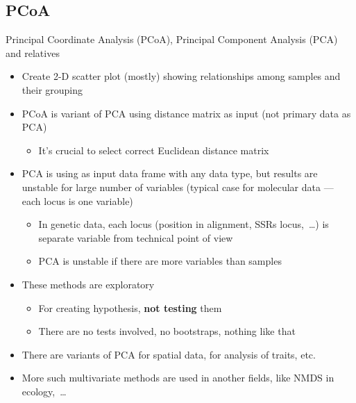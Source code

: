 \documentclass[compress, xelatex, 11pt, xcolor=svgnames, aspectratio=169, url={hyphens, lowtilde}]{beamer}
\begin{document}
\subsection{PCoA}

\begin{frame}{Principal Coordinate Analysis (PCoA), Principal Component Analysis (PCA) and relatives}
	\label{pcoa}
	\begin{itemize}
		\item Create 2-D scatter plot (mostly) showing relationships among samples and their grouping
		\item PCoA is variant of PCA using distance matrix as input (not primary data as PCA)
		\begin{itemize}
			\item It's crucial to select correct Euclidean distance matrix
		\end{itemize}
		\item PCA is using as input data frame with any data type, but results are unstable for large number of variables (typical case for molecular data --- each locus is one variable)
		\begin{itemize}
			\item In genetic data, each locus (position in alignment, SSRs locus,~\ldots) is separate variable from technical point of view
			\item PCA is unstable if there are more variables than samples
		\end{itemize}
		\item These methods are exploratory
		\begin{itemize}
			\item For creating hypothesis, \textbf{not testing} them
			\item There are no tests involved, no bootstraps, nothing like that
		\end{itemize}
		\item There are variants of PCA for spatial data, for analysis of traits, etc.
		\item More such multivariate methods are used in another fields, like NMDS in ecology,~\ldots
	\end{itemize}
\end{frame}
\end{document}
